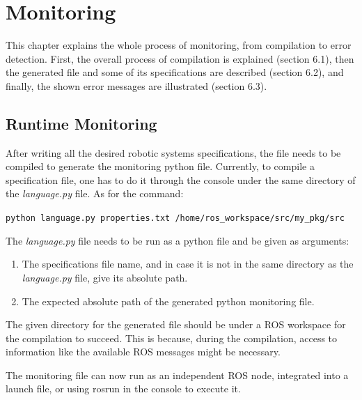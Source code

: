 \chapter{Monitoring}
\label{chap:monitoring}

This chapter explains the whole process of monitoring, from compilation to error detection. First, the overall process of compilation is explained (section 6.1), then the generated file and some of its specifications are described (section 6.2), and finally, the shown error messages are illustrated (section 6.3).

\section{Runtime Monitoring}

After writing all the desired robotic systems specifications, the file needs to be compiled to generate the monitoring python file. Currently, to compile a specification file, one has to do it through the console under the same directory of the \textit{language.py} file. As for the command:

\texttt{python language.py properties.txt /home/ros\_workspace/src/my\_pkg/src}

The \textit{language.py} file needs to be run as a python file and be given as arguments:

\begin{enumerate}
    \item The specifications file name, and in case it is not in the same directory as the \textit{language.py} file, give its absolute path.
    \item The expected absolute path of the generated python monitoring file.
\end{enumerate}

The given directory for the generated file should be under a ROS workspace for the compilation to succeed. This is because, during the compilation, access to information like the available ROS messages might be necessary.

The monitoring file can now run as an independent ROS node, integrated into a launch file, or using rosrun in the console to execute it.



